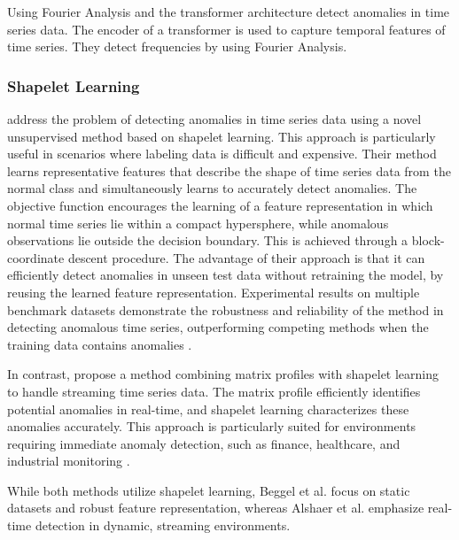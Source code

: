 Using Fourier Analysis and the transformer architecture  detect anomalies in time series data. The encoder of a transformer is used to capture temporal features of time series. They detect frequencies by using Fourier Analysis.

\subsubsection{Shapelet Learning}
 address the problem of detecting anomalies in time series data using a novel unsupervised method based on shapelet learning. This approach is particularly useful in scenarios where labeling data is difficult and expensive.
Their method learns representative features that describe the shape of time series data from the normal class and simultaneously learns to accurately detect anomalies. The objective function encourages the learning of a feature representation in which normal time series lie within a compact hypersphere, while anomalous observations lie outside the decision boundary. This is achieved through a block-coordinate descent procedure.
The advantage of their approach is that it can efficiently detect anomalies in unseen test data without retraining the model, by reusing the learned feature representation. Experimental results on multiple benchmark datasets demonstrate the robustness and reliability of the method in detecting anomalous time series, outperforming competing methods when the training data contains anomalies .

In contrast,  propose a method combining matrix profiles with shapelet learning to handle streaming time series data. The matrix profile efficiently identifies potential anomalies in real-time, and shapelet learning characterizes these anomalies accurately. This approach is particularly suited for environments requiring immediate anomaly detection, such as finance, healthcare, and industrial monitoring .

While both methods utilize shapelet learning, Beggel et al. focus on static datasets and robust feature representation, whereas Alshaer et al. emphasize real-time detection in dynamic, streaming environments.

